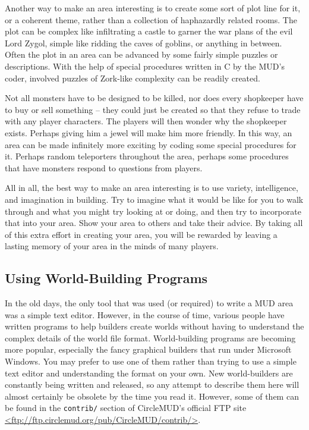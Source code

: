 \documentclass[11pt]{article}
\begin{document}
Another way to make an area interesting is to create some sort of plot line for it, or a coherent theme, rather than a collection of haphazardly related rooms.  The plot can be complex like infiltrating a castle to garner the war plans of the evil Lord Zygol, simple like ridding the caves of goblins, or anything in between.  Often the plot in an area can be advanced by some fairly simple puzzles or descriptions.  With the help of special procedures written in C by the MUD's coder, involved puzzles of Zork-like complexity can be readily created. 
\par
Not all monsters have to be designed to be killed, nor does every shopkeeper have to buy or sell something -- they could just be created so that they refuse to trade with any player characters.  The players will then wonder why the shopkeeper exists.  Perhaps giving him a jewel will make him more friendly.  In this way, an area can be made infinitely more exciting by coding some special procedures for it.  Perhaps random teleporters throughout the area, perhaps some procedures that have monsters respond to questions from players. 
\par
All in all, the best way to make an area interesting is to use variety, intelligence, and imagination in building.  Try to imagine what it would be like for you to walk through and what you might try looking at or doing, and then try to incorporate that into your area.  Show your area to others and take their advice.  By taking all of this extra effort in creating your area, you will be rewarded by leaving a lasting memory of your area in the minds of many players. 

\subsection{Using World-Building Programs}
In the old days, the only tool that was used (or required) to write a MUD area was a simple text editor.  However, in the course of time, various people have written programs to help builders create worlds without having to understand the complex details of the world file format.  World-building programs are becoming more popular, especially the fancy graphical builders that run under Microsoft Windows.  You may prefer to use one of them rather than trying to use a simple text editor and understanding the format on your own.  New world-builders are constantly being written
and released, so any attempt to describe them here will almost certainly be obsolete by the time you read it.  However, some of them can be found
in the \texttt{contrib/} section of CircleMUD's official FTP site
\url{<ftp://ftp.circlemud.org/pub/CircleMUD/contrib/>}.
\end{document}
